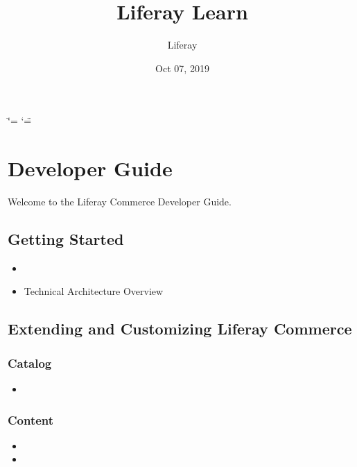 \documentclass[letterpaper,10pt,english]{sphinxmanual}
\title{Liferay Learn}
\date{Oct 07, 2019}
\author{Liferay}
\begin{document}
\ifdefined\shorthandoff
  \ifnum\catcode`\=\string=\active\shorthandoff{=}\fi
  \ifnum\catcode`\"=\active{}\fi
\fi

\pagestyle{empty}
\sphinxmaketitle
\pagestyle{plain}
\sphinxtableofcontents
\pagestyle{normal}
\label{\detokenize{contents::doc}}



\chapter{Developer Guide}
\label{\detokenize{product/developer-guide/README:developer-guide}}\label{\detokenize{product/developer-guide/README::doc}}
Welcome to the Liferay Commerce Developer Guide.


\section{Getting Started}
\label{\detokenize{product/developer-guide/README:getting-started}}\begin{itemize}
\item {} 

\item {} 
Technical Architecture Overview

\end{itemize}


\section{Extending and Customizing Liferay Commerce}
\label{\detokenize{product/developer-guide/README:extending-and-customizing-liferay-commerce}}

\subsection{Catalog}
\label{\detokenize{product/developer-guide/README:catalog}}\begin{itemize}
\item {} 

\end{itemize}


\subsection{Content}
\label{\detokenize{product/developer-guide/README:content}}\begin{itemize}
\item {} 

\item {} 

\end{itemize}
\end{document}
